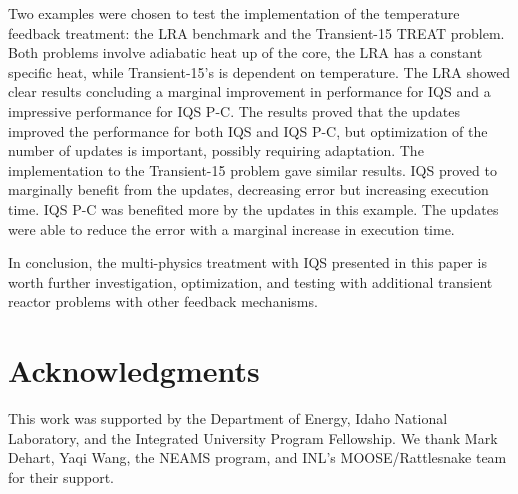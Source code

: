 \documentclass{anstrans}
\begin{document}
Two examples were chosen to test the implementation of the temperature feedback treatment: the LRA benchmark and the Transient-15 TREAT problem.  Both problems involve adiabatic heat up of the core, the LRA has a constant specific heat, while Transient-15's is dependent on temperature.  The LRA showed clear results concluding a marginal improvement in performance for IQS and a impressive performance for IQS P-C.  The results proved that the updates improved the performance for both IQS and IQS P-C, but optimization of the number of updates is important, possibly requiring adaptation.  The implementation to the Transient-15 problem gave similar results.  IQS proved to marginally benefit from the updates, decreasing error but increasing execution time.  IQS P-C was benefited more by the updates in this example. The updates were able to reduce the error with a marginal increase in execution time.

In conclusion, the multi-physics treatment with IQS presented in this paper is worth further investigation, optimization, and testing with additional transient reactor problems with other feedback mechanisms.   


\section{Acknowledgments}
This work was supported by the Department of Energy, Idaho National Laboratory, and the Integrated University Program Fellowship.  We thank Mark Dehart, Yaqi Wang, the NEAMS program, and INL's MOOSE/Rattlesnake team for their support.



\end{document}
